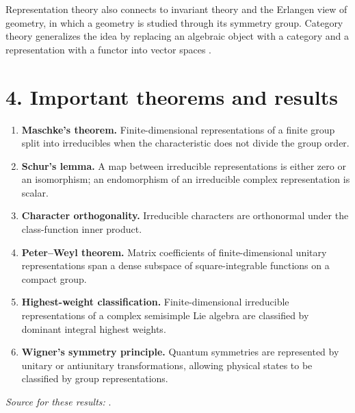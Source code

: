 Representation theory also connects to invariant theory and the Erlangen view of geometry, in which a geometry is studied through its symmetry group. Category theory generalizes the idea by replacing an algebraic object with a category and a representation with a functor into vector spaces \cite{representation_ref4}.

\section*{4. Important theorems and results}
\begin{enumerate}[leftmargin=*,itemsep=0.35em]
\item \textbf{Maschke's theorem.} Finite-dimensional representations of a finite group split into irreducibles when the characteristic does not divide the group order.

\item \textbf{Schur's lemma.} A map between irreducible representations is either zero or an isomorphism; an endomorphism of an irreducible complex representation is scalar.

\item \textbf{Character orthogonality.} Irreducible characters are orthonormal under the class-function inner product.

\item \textbf{Peter--Weyl theorem.} Matrix coefficients of finite-dimensional unitary representations span a dense subspace of square-integrable functions on a compact group.

\item \textbf{Highest-weight classification.} Finite-dimensional irreducible representations of a complex semisimple Lie algebra are classified by dominant integral highest weights.

\item \textbf{Wigner's symmetry principle.} Quantum symmetries are represented by unitary or antiunitary transformations, allowing physical states to be classified by group representations.
\end{enumerate}
\noindent\emph{Source for these results:} \cite{representation_ref1}.

